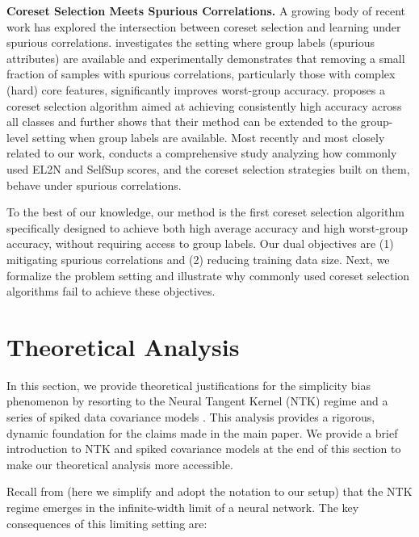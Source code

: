 \documentclass[letter,11pt]{article}
\begin{document}
\noindent \textbf{Coreset Selection Meets Spurious Correlations.} A growing body of recent work has explored the intersection between coreset selection and learning under spurious correlations. \citep{MS_DP} investigates the setting where group labels (spurious attributes) are available and experimentally demonstrates that removing a small fraction of samples with spurious correlations, particularly those with complex (hard) core features, significantly improves worst-group accuracy. \citep{DROP} proposes a coreset selection algorithm aimed at achieving consistently high accuracy across all classes and further shows that their method can be extended to the group-level setting when group labels are available. Most recently and most closely related to our work, \citep{CS_LR} conducts a comprehensive study analyzing how commonly used EL2N and SelfSup scores, and the coreset selection strategies built on them, behave under spurious correlations.

To the best of our knowledge, our method is the first coreset selection algorithm specifically designed to achieve both high average accuracy and high worst-group accuracy, without requiring access to group labels. Our dual objectives are (1) mitigating spurious correlations and (2) reducing training data size. Next, we formalize the problem setting and illustrate why commonly used coreset selection algorithms fail to achieve these objectives.

\section{Theoretical Analysis}\label{sec:app_theo_anal}

In this section, we provide theoretical justifications for the simplicity bias phenomenon by resorting to the Neural Tangent Kernel (NTK) regime \citep{NTK_1} and a series of spiked data covariance models \citep{paul2007asymptotics,wang2024nonlinear}. This analysis provides a rigorous, dynamic foundation for the claims made in the main paper. We provide a brief introduction to NTK and spiked covariance models at the end of this section to make our theoretical analysis more accessible.

Recall from \citep{NTK_1} (here we simplify and adopt the notation to our setup) that the NTK regime emerges in the infinite-width limit of a neural network. The key consequences of this limiting setting are: 
\end{document}
